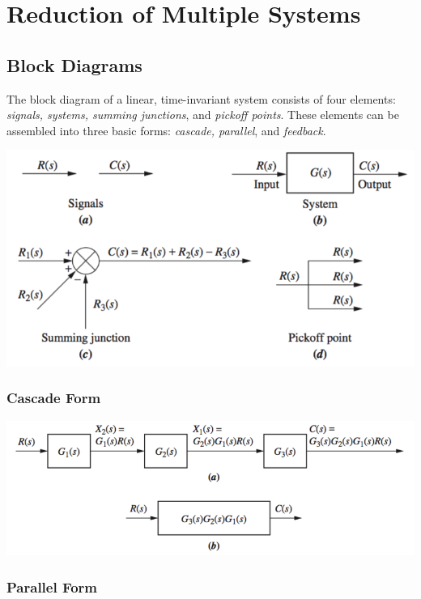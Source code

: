 \documentclass[11pt]{article}
\begin{document}
    \pagebreak

    
    \section{Reduction of Multiple Systems}

    \subsection{Block Diagrams}

    The block diagram of a linear, time-invariant system consists of four elements: \textit{signals, systems, summing junctions}, and \textit{pickoff points}. These elements can be assembled into three basic forms: \textit{cascade, parallel}, and \textit{feedback}.

    \begin{center}
        \includegraphics[width=300 px]{img/reduction} \\
    \end{center}

    \subsubsection{Cascade Form}

    \begin{center}
        \includegraphics[width=300 px]{img/cascade} \\
    \end{center}

    \subsubsection{Parallel Form}
\end{document}

